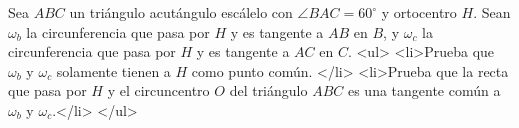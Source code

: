 Sea $ABC$ un triángulo acutángulo escálelo con $\angle BAC=60^{\circ}$ y ortocentro $H$. Sean $\omega_b$ la circunferencia que pasa por $H$ y es tangente a $AB$ en $B$, y $\omega_c$ la circunferencia que pasa por $H$ y es tangente a $AC$ en $C$. 
<ul>
<li>Prueba que $\omega_b$ y $\omega_c$ solamente tienen a $H$ como punto común. </li>
<li>Prueba que la recta que pasa por $H$ y el circuncentro $O$ del triángulo $ABC$ es una tangente común a $\omega_b$ y $\omega_c$.</li>
</ul>